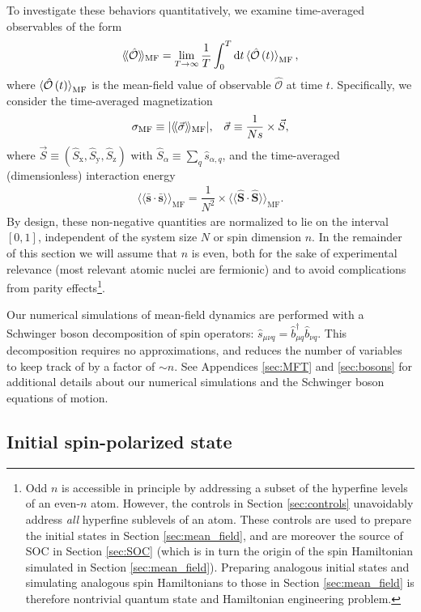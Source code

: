 \documentclass[aps,pra,nofootinbib,twocolumn,superscriptaddress]{revtex4-2}
\newcommand{\f}[2]{\dfrac{#1}{#2}} %
\newcommand{\p}[1]{\left(#1\right)} %
\newcommand{\bk}{\braket} %
\renewcommand{\dd}{\text{d}} %
\newcommand{\bbk}[1]{\langle\!\langle #1 \rangle\!\rangle}
\newcommand{\1}{\mathds{1}}
\renewcommand{\b}{\hat{b}}
\newcommand{\s}{\hat{s}}
\renewcommand{\S}{\hat{S}}
\renewcommand{\O}{\hat{\mathcal{O}}}
\newcommand{\x}{\text{x}}
\newcommand{\y}{\text{y}}
\newcommand{\z}{\text{z}}
\newcommand{\MF}{\text{MF}}
\newcommand{\sds}{\bar{\bm{s}}\cdot\bar{\bm{s}}}
\begin{document}
To investigate these behaviors quantitatively, we examine time-averaged observables of the form
\begin{align}
  \bbk{\O}_\MF = \lim_{T\to\infty} \f1T \int_0^T \dd t \bk{\O\p{t}}_\MF,
\end{align}
where $\bk{\O\p{t}}_\MF$ is the mean-field value of observable $\O$ at time $t$.
Specifically, we consider the time-averaged magnetization
\begin{align}
  \sigma_\MF \equiv \abs{\bbk{\vec\sigma}_\MF},
  &&
  \vec\sigma \equiv \f1{Ns} \times \vec S,
\end{align}
where $\vec S\equiv(\S_\x,\S_\y,\S_\z)$ with $\S_\alpha \equiv \sum_q \s_{\alpha,q}$, and the time-averaged (dimensionless) interaction energy
\begin{align}
  \bbk{\sds}_\MF = \f1{N^2} \times \bbk{\bm\S\cdot\bm\S}_\MF.
\end{align}
By design, these non-negative quantities are normalized to lie on the interval $[0,1]$, independent of the system size $N$ or spin dimension $n$.
In the remainder of this section we will assume that $n$ is even, both for the sake of experimental relevance (most relevant atomic nuclei are fermionic) and to avoid complications from parity effects\footnote{
Odd $n$ is accessible in principle by addressing a subset of the hyperfine levels of an even-$n$ atom.
However, the controls in Section \ref{sec:controls} unavoidably address \textit{all} hyperfine sublevels of an atom.
These controls are used to prepare the initial states in Section \ref{sec:mean_field}, and are moreover the source of SOC in Section \ref{sec:SOC} (which is in turn the origin of the spin Hamiltonian simulated in Section \ref{sec:mean_field}).
Preparing analogous initial states and simulating analogous spin Hamiltonians to those in Section \ref{sec:mean_field} is therefore nontrivial quantum state and Hamiltonian engineering problem.
}.

Our numerical simulations of mean-field dynamics are performed with a Schwinger boson decomposition of spin operators: $\s_{\mu\nu q} = \b_{\mu q}^\dag\b_{\nu q}$.
This decomposition requires no approximations, and reduces the number of variables to keep track of by a factor of $\sim n$.
See Appendices \ref{sec:MFT} and \ref{sec:bosons} for additional details about our numerical simulations and the Schwinger boson equations of motion.

\subsection{Initial spin-polarized state}
\end{document}
